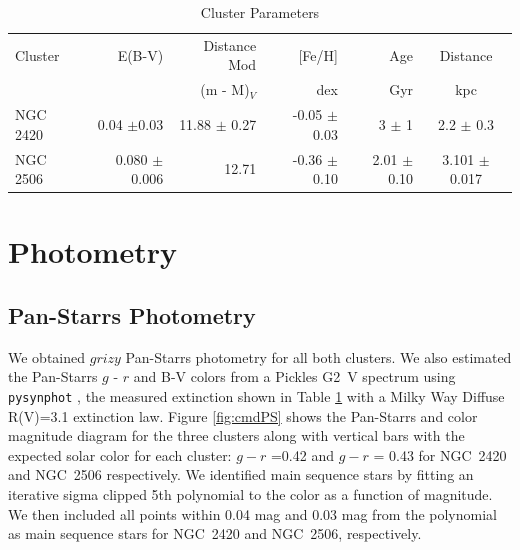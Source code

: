 \documentclass{aastex6}
\newcommand{\DHSresApprox}{300}
\begin{document}
\begin{table}
\centering
\caption{Cluster Parameters}\label{tab:clusterProp}
\begin{tabular}{lrrrrc}
\hline \hline
Cluster   					&  E(B-V) 			& Distance Mod 	& [Fe/H] 			& Age 		& Distance\\
          					&     				&    (m - M)$_V$	& 	dex 			& Gyr 		& kpc	\\
\hline \hline
NGC 2420\tablenotemark{b}	& 0.04 $\pm$0.03	&  11.88 $\pm$ 0.27	& -0.05 $\pm$ 0.03	& 3 $\pm$ 1 	& 2.2 $\pm$ 0.3 \\
NGC 2506\tablenotemark{c}	& 0.080 $\pm$ 0.006	&  12.71\tablenotemark{a}	 	& -0.36 $\pm$ 0.10			& 2.01 $\pm$ 0.10 & 3.101 $\pm$ 0.017 \\
\hline
\end{tabular}
\end{table}

\section{Photometry}\label{sec:photometry}
\subsection{Pan-Starrs Photometry}\label{sec:panStarsPhot}

We obtained $grizy$ Pan-Starrs photometry \citep{magnier2013photLadder,schlafly2012photcal,tonry2012panstarrsPhot} for all both clusters.
We also estimated the Pan-Starrs $g$ - $r$ and B-V colors from a Pickles G2~V spectrum using \texttt{pysynphot} \citep{lim2015pysynphot}, the measured extinction shown in Table \ref{tab:clusterProp} with a Milky Way Diffuse R(V)=3.1 \citet{cardelli1989} extinction law.
Figure \ref{fig:cmdPS} shows the Pan-Starrs and \citet{janes2013keplerPhot} color magnitude diagram for the three clusters along with vertical bars with the expected solar color for each cluster: $g-r$ =0.42 and $g-r$ = 0.43 for NGC~2420 and NGC~2506 respectively.
We identified main sequence stars by fitting an iterative sigma clipped 5th polynomial to the color as a function of magnitude.
We then included all points within 0.04 mag and 0.03 mag from the polynomial as main sequence stars for NGC~2420 and NGC~2506, respectively.
\end{document}

